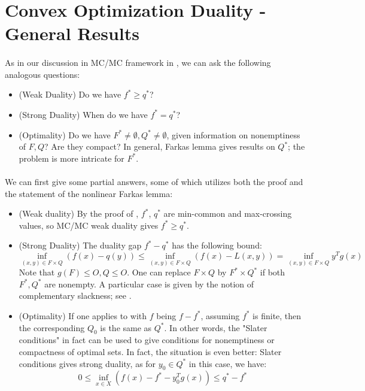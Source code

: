 \section{Convex Optimization Duality - General Results}
\label{sect:042}

\paragraph{}As in our discussion in MC/MC framework in , we can ask the following analogous questions:
\begin{itemize}
	\item (Weak Duality) Do we have $f^\ast\geq q^\ast$?
	\item (Strong Duality) When do we have $f^\ast=q^\ast$?
	\item (Optimality) Do we have $F^\ast\neq\emptyset,Q^\ast\neq\emptyset$, given information on nonemptiness of $F,Q$? Are they compact? In general, Farkas lemma gives results on $Q^\ast$; the problem is more intricate for $F^\ast$.
\end{itemize}

\paragraph{}We can first give some partial answers, some of which utilizes both the proof and the statement of the nonlinear Farkas lemma:
\begin{itemize}
	\item (Weak duality) By the proof of , $f^\ast$, $q^\ast$ are min-common and max-crossing values, so MC/MC weak duality gives $f^\ast\geq q^\ast$.
	\item (Strong Duality) The duality gap $f^\ast-q^\ast$ has the following bound:
	      \[
		      \underset{(x,y)\in F\times Q}{\operatorname{inf}}\left(f(x)-q(y)\right)\leq
		      \underset{(x,y)\in F\times Q}{\operatorname{inf}}\left(f(x)-L(x,y)\right)=
		      \underset{(x,y)\in F\times Q}{\operatorname{inf}}y^Tg(x)
	      \]
	      Note that $g(F)\leq O,Q\leq O$. One can replace $F\times Q$ by $F^\ast\times Q^\ast$ if both $F^\ast,Q^\ast$ are nonempty. A particular case is given by the notion of complementary slackness; see .
	\item (Optimality) If one applies  to  with $f$ being $f-f^\ast$, assuming $f^\ast$ is finite, then the corresponding $Q_0$ is the same as $Q^\ast$. In other words, the "Slater conditions" in fact can be used to give conditions for nonemptiness or compactness of optimal sets. In fact, the situation is even better: Slater conditions gives strong duality, as for $y_0\in Q^\ast$ in this case, we have:
	      \[
		      0\leq \underset{x\in X}{\operatorname{inf}} \left(f(x)-f^\ast-y_0^T g(x)\right) \leq q^\ast-f^\ast
	      \]
\end{itemize}

